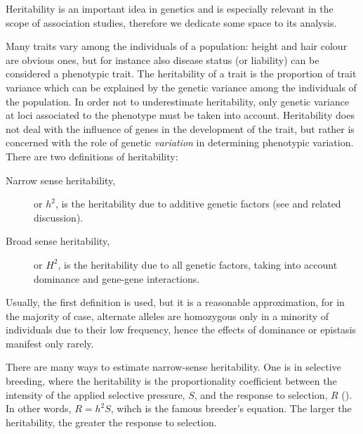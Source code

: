 \documentclass[../main.tex]{subfiles}
\begin{document}
Heritability is an important idea in genetics and is especially relevant 
in the scope of association studies, therefore we dedicate some space to 
its analysis.

Many traits vary among the individuals of a population: height and hair 
colour are obvious ones, but for instance also disease status (or 
liability) can be considered a phenotypic trait. The heritability of a 
trait is the proportion of trait variance which can be explained by the 
genetic variance among the individuals of the population. In order not 
to underestimate heritability, only genetic variance at loci associated 
to the phenotype must be taken into account. 
Heritability does not deal with the influence of genes in the 
development of the trait, but rather is concerned with the role of 
genetic \textit{variation} in determining phenotypic variation. There 
are two definitions of heritability:

\begin{description}
	\item[Narrow sense heritability,] or $h^2$, is the heritability due 
to additive genetic factors (see  and related 
discussion).
	\item[Broad sense heritability,] or $H^2$, is the heritability due 
to all genetic factors, taking into account dominance and gene-gene 
interactions.
\end{description}


Usually, the first definition is used, but it is a reasonable 
approximation, for in the majority of case, alternate alleles are 
homozygous only in a minority of individuals due to their low frequency, 
hence the effects of dominance or epistasis manifest only 
rarely\cite{Visscher2008}.

There are many ways to estimate narrow-sense heritability. One is in 
selective breeding, where the heritability is the proportionality 
coefficient between the intensity of the applied selective pressure, 
$S$, and the response to selection, $R$ (). In other 
words, $R = h^2 S$, wihch is the famous breeder's equation. The larger 
the heritability, the greater the response to selection.
\end{document}
